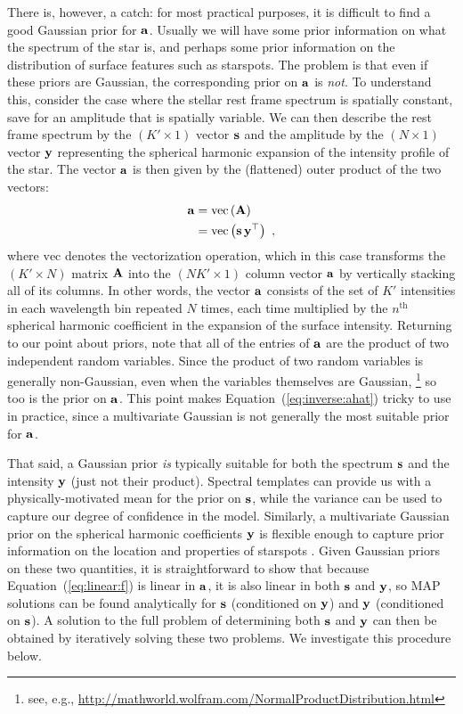 \documentclass[modern]{aastex631}
\begin{document}
There is, however, a catch: for most practical purposes, it is difficult to find a good Gaussian prior for ${\mathbf{a}}$. 
Usually we will have some prior information on what the spectrum of the star is, and perhaps some prior information on the distribution of surface features such as starspots. 
The problem is that even if these priors are Gaussian, the corresponding prior on ${\mathbf{a}}$ is \emph{not}. 
To understand this, consider the case where the stellar rest frame spectrum is spatially constant, save for an amplitude that is spatially variable. 
We can then describe the rest frame spectrum by the $(K' \times 1)$ vector ${\mathbf{s}}$ and the amplitude by the $(N \times 1)$ vector ${\mathbf{y}}$ representing the spherical harmonic expansion of the intensity profile of the star. 
The vector ${\mathbf{a}}$ is then given by the (flattened) outer product of the two vectors:
%
\begin{align}
    \label{eq:inverse:alm}
    {\ensuremath{\mathbf{a}}} & = \mathrm{vec}\left( {\mathbf{A}} \right) \nonumber             \\
           & = \mathrm{vec}\left( {\mathbf{s}} \, {\mathbf{y}}^\top \right) \hskip 0.33em,
\end{align}
%
where $\mathrm{vec}$ denotes the vectorization operation, which in this case transforms the $(K' \times N)$ matrix ${\mathbf{A}}$ into the $(N K' \times 1)$ column vector ${\mathbf{a}}$ by vertically stacking all of its columns. 
In other words, the vector ${\mathbf{a}}$ consists of the set of $K'$ intensities in each wavelength bin repeated $N$ times, each time multiplied by the $n^\mathrm{th}$ spherical harmonic coefficient in the expansion of the surface intensity. 
Returning to our point about priors, note that all of the entries of ${\mathbf{a}}$ are the product of two independent random variables. 
Since the product of two random variables is generally non-Gaussian, even when the variables themselves are Gaussian,%
\footnote{see, e.g., \url{http://mathworld.wolfram.com/NormalProductDistribution.html}}
so too is the prior on ${\mathbf{a}}$. 
This point makes Equation~(\ref{eq:inverse:ahat}) tricky to use in practice, since a multivariate Gaussian is not generally the most suitable prior for ${\mathbf{a}}$.

That said, a Gaussian prior \emph{is} typically suitable for both the spectrum ${\mathbf{s}}$ and the intensity ${\mathbf{y}}$ (just not their product). 
Spectral templates can provide us with a physically-motivated mean for the prior on ${\mathbf{s}}$, while the variance can be used to capture our degree of confidence in the model.
Similarly, a multivariate Gaussian prior on the spherical harmonic coefficients ${\mathbf{y}}$ is flexible enough to capture prior information on the location and properties of starspots \citep{Luger2021b}.
%
Given Gaussian priors on these two quantities, it is straightforward to show that because Equation~(\ref{eq:linear:f}) is linear in ${\mathbf{a}}$, it is also linear in both ${\mathbf{s}}$ and ${\mathbf{y}}$, so MAP solutions can be found analytically for ${\mathbf{s}}$ (conditioned on ${\mathbf{y}}$) and ${\mathbf{y}}$ (conditioned on ${\mathbf{s}}$).
A solution to the full problem of determining both ${\mathbf{s}}$ and ${\mathbf{y}}$ can then be obtained by iteratively solving these two problems.
We investigate this procedure below.
\end{document}
